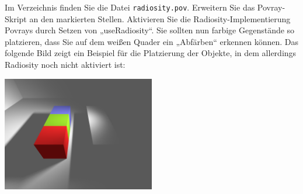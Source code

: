 %
Im Verzeichnis  finden Sie die 
Datei \texttt{radiosity.pov}. Erweitern Sie 
das Povray-Skript an den markierten Stellen. Aktivieren Sie die 
Radiosity-Implementierung Povrays durch Setzen von „useRadiosity“. Sie 
sollten nun farbige Gegenstände so platzieren, dass Sie auf dem weißen 
Quader ein „Abfärben“ erkennen können. Das folgende Bild zeigt ein
Beispiel für die Platzierung der Objekte, in dem allerdings Radiosity 
noch nicht aktiviert ist:
\begin{center}
  \includegraphics[width=0.5\textwidth]{radiosity.png}
\end{center}
